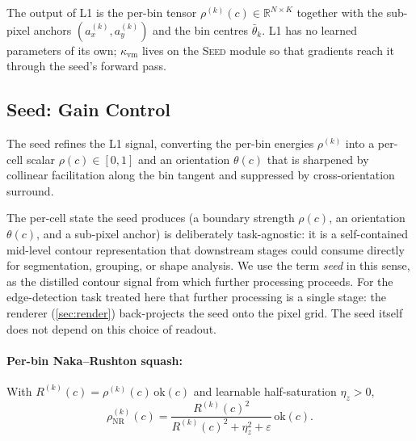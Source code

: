 \documentclass[11pt,a4paper]{article}
\newcommand{\R}{\mathbb{R}}
\begin{document}
The output of L1 is the per-bin tensor $\rho^{(k)}(c) \in \R^{N \times K}$ together with the sub-pixel anchors $(a_x^{(k)}, a_y^{(k)})$ and the bin centres $\bar\theta_k$. L1 has no learned parameters of its own; $\kappa_{\mathrm{vm}}$ lives on the \textsc{Seed} module so that gradients reach it through the seed's forward pass.

\subsection{Seed: Gain Control}\label{sec:seed}

The seed refines the L1 signal, converting the per-bin energies $\rho^{(k)}$ into a per-cell scalar $\rho(c) \in [0, 1]$ and an orientation $\theta(c)$ that is sharpened by collinear facilitation along the bin tangent and suppressed by cross-orientation surround.

The per-cell state the seed produces (a boundary strength $\rho(c)$, an orientation $\theta(c)$, and a sub-pixel anchor) is deliberately task-agnostic: it is a self-contained mid-level contour representation that downstream stages could consume directly for segmentation, grouping, or shape analysis. We use the term \emph{seed} in this sense, as the distilled contour signal from which further processing proceeds. For the edge-detection task treated here that further processing is a single stage: the renderer (\cref{sec:render}) back-projects the seed onto the pixel grid. The seed itself does not depend on this choice of readout.

\paragraph{Per-bin Naka--Rushton squash:}
With $R^{(k)}(c) = \rho^{(k)}(c)\,\mathrm{ok}(c)$ and learnable half-saturation $\eta_z > 0$,
\begin{equation}\label{eq:rho-nr}
  \rho_{\mathrm{NR}}^{(k)}(c) = \frac{R^{(k)}(c)^2}{R^{(k)}(c)^2 + \eta_z^2 + \varepsilon}\,\mathrm{ok}(c).
\end{equation}
\end{document}
